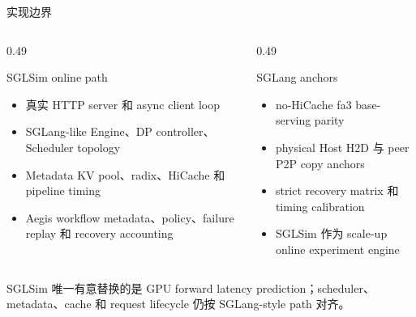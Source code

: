 \documentclass[aspectratio=43]{beamer}
\newcommand{\tightitems}{\setlength{\itemsep}{2pt}\setlength{\parskip}{0pt}}
\begin{document}
\begin{frame}{实现边界}
  \small
  \begin{columns}[T,onlytextwidth]
    \begin{column}{0.49\textwidth}
      \begin{block}{SGLSim online path}
        \begin{itemize}
          \tightitems
          \item 真实 HTTP server 和 async client loop
          \item SGLang-like Engine、DP controller、Scheduler topology
          \item Metadata KV pool、radix、HiCache 和 pipeline timing
          \item Aegis workflow metadata、policy、failure replay 和 recovery accounting
        \end{itemize}
      \end{block}
    \end{column}
    \begin{column}{0.49\textwidth}
      \begin{block}{SGLang anchors}
        \begin{itemize}
          \tightitems
          \item no-HiCache fa3 base-serving parity
          \item physical Host H2D 与 peer P2P copy anchors
          \item strict recovery matrix 和 timing calibration
          \item SGLSim 作为 scale-up online experiment engine
        \end{itemize}
      \end{block}
    \end{column}
  \end{columns}

  \vspace{0.10cm}
  \footnotesize
  SGLSim 唯一有意替换的是 GPU forward latency prediction；scheduler、metadata、cache 和 request lifecycle 仍按 SGLang-style path 对齐。
\end{frame}
\end{document}
